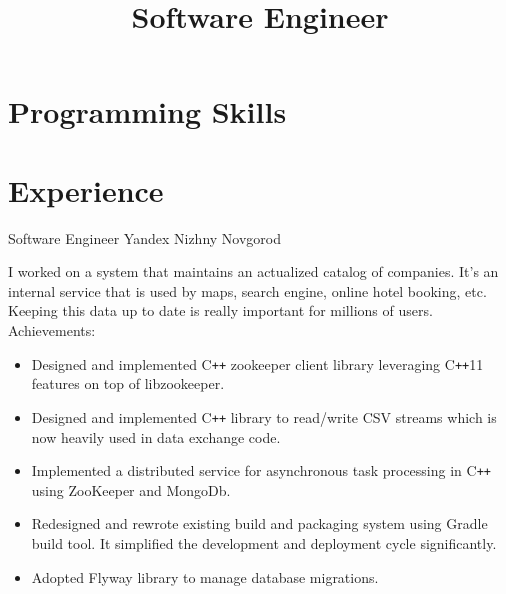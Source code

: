 \documentclass[11pt,a4paper,sans]{moderncv}
\title{Software Engineer}
\newcommand{\Cpp}{C{}\texttt{++}}
\begin{document}
\makecvtitle

\section{Programming Skills}
\cvitem{Proficient}{\Cpp{}, C, Java}

\section{Experience}
{Software Engineer}
{Yandex}
{Nizhny Novgorod}
{}
{I worked on a system that maintains an actualized catalog of
  companies.  It's an internal service that is used by maps, search
  engine, online hotel booking, etc.  Keeping this data up to date is
  really important for millions of users.
\newline{}
Achievements:
\begin{itemize}
\item Designed and implemented \Cpp{} zookeeper client library leveraging
  \Cpp{}11 features on top of libzookeeper.
\item Designed and implemented \Cpp{} library to read/write CSV streams
  which is now heavily used in data exchange code.
\item Implemented a distributed service for asynchronous task
  processing in \Cpp{} using ZooKeeper and MongoDb.
\item Redesigned and rewrote existing build and packaging system using
  Gradle build tool. It simplified the development and deployment
  cycle significantly.
\item Adopted Flyway library to manage database migrations.
\end{itemize}
}
\end{document}
